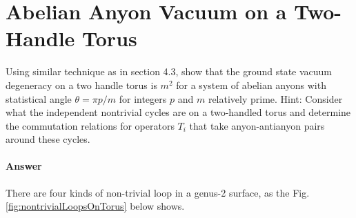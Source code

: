 \documentclass{book}
\begin{document}
\section{Abelian Anyon Vacuum on a Two-Handle Torus}
Using similar technique as in section 4.3, show that the ground state vacuum degeneracy on a two handle torus is $m^{2}$ for a system of abelian anyons with statistical angle $\theta =\pi p/m$ for integers $p$ and $m$ relatively prime. Hint: Consider what the independent nontrivial cycles are on a two-handled torus and determine the commutation relations for operators $T_{i}$ that take anyon-antianyon pairs around these cycles.

\paragraph{Answer}
There are four kinds of non-trivial loop in a genus-2 surface, as the Fig. \ref{fig:nontrivialLoopsOnTorus} below shows.
\end{document}
